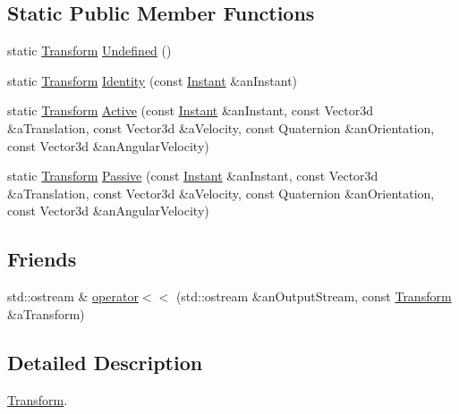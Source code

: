 \subsection*{Static Public Member Functions}
\begin{DoxyCompactItemize}
\item 
static \hyperlink{classlibrary_1_1physics_1_1coord_1_1_transform}{Transform} \hyperlink{classlibrary_1_1physics_1_1coord_1_1_transform_ac346b5703e94945a10ab222bf38d2a08}{Undefined} ()
\item 
static \hyperlink{classlibrary_1_1physics_1_1coord_1_1_transform}{Transform} \hyperlink{classlibrary_1_1physics_1_1coord_1_1_transform_a941cf2c273c2c95d0a43e1050e35d537}{Identity} (const \hyperlink{classlibrary_1_1physics_1_1time_1_1_instant}{Instant} \&an\+Instant)
\item 
static \hyperlink{classlibrary_1_1physics_1_1coord_1_1_transform}{Transform} \hyperlink{classlibrary_1_1physics_1_1coord_1_1_transform_aa82ab1a4be06a10e7c8f004062fcc35d}{Active} (const \hyperlink{classlibrary_1_1physics_1_1time_1_1_instant}{Instant} \&an\+Instant, const Vector3d \&a\+Translation, const Vector3d \&a\+Velocity, const Quaternion \&an\+Orientation, const Vector3d \&an\+Angular\+Velocity)
\item 
static \hyperlink{classlibrary_1_1physics_1_1coord_1_1_transform}{Transform} \hyperlink{classlibrary_1_1physics_1_1coord_1_1_transform_ac8d745aa497d7713a19aa8652acb02c6}{Passive} (const \hyperlink{classlibrary_1_1physics_1_1time_1_1_instant}{Instant} \&an\+Instant, const Vector3d \&a\+Translation, const Vector3d \&a\+Velocity, const Quaternion \&an\+Orientation, const Vector3d \&an\+Angular\+Velocity)
\end{DoxyCompactItemize}
\subsection*{Friends}
\begin{DoxyCompactItemize}
\item 
std\+::ostream \& \hyperlink{classlibrary_1_1physics_1_1coord_1_1_transform_ae46ab7a297c23b757fd6f41bf30c4054}{operator$<$$<$} (std\+::ostream \&an\+Output\+Stream, const \hyperlink{classlibrary_1_1physics_1_1coord_1_1_transform}{Transform} \&a\+Transform)
\end{DoxyCompactItemize}


\subsection{Detailed Description}
\hyperlink{classlibrary_1_1physics_1_1coord_1_1_transform}{Transform}. 

